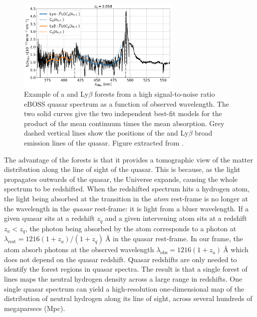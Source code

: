 \begin{figure}[!th]
    \centering
    \includegraphics[width=0.7\textwidth]{fig/forests/forest_example.png}
    \caption{Example of a \lya and Ly$\beta$ forests from a high signal-to-noise ratio 
    eBOSS quasar spectrum as a function of observed wavelength. 
    The two solid curves give the two independent best-fit models for the product of the mean continuum times the mean absorption. 
    Grey dashed vertical lines show the positions of the \lya and Ly$\beta$ broad emission lines of the quasar. 
    Figure extracted from \cite{dumasdesbourbouxhelionCompletedSDSSIVExtended2020}.}
    \label{fig:forest}
\end{figure}

The advantage of the forests is that it provides a tomographic 
view of the matter distribution along the line of sight of the quasar. 
This is because, as the light propagates outwards of the quasar, the 
Universe expands, causing the whole spectrum to be redshifted. 
When the redshifted spectrum hits a hydrogen atom, the light being
absorbed at the \lya transition in the \emph{atom} rest-frame 
is no longer at the \lya wavelength in the \emph{quasar} rest-frame:
it is light from a bluer wavelength. 
If a given quasar sits at a redshift $z_q$ and 
a given intervening atom sits at a redshift $z_a < z_q$, the \lya photon being absorbed
by the atom corresponds to a photon at $\lambda_\mathrm{rest}= 1216(1+z_a)/(1+z_q)~\unit{\angstrom}$
in the quasar rest-frame. 
In our frame, the atom absorb \lya photons at the observed wavelength
$\lambda_\mathrm{obs}= {1216(1+z_a)}~\unit{\angstrom}$ which does not depend on the quasar redshift.
Quasar redshifts are only needed to identify the \lya forest regions in quasar spectra. 
The result is that a single forest of lines maps the neutral
hydrogen density across a large range in redshifts. 
One single quasar spectrum can yield a high-resolution one-dimensional map of 
the distribution of neutral hydrogen along its line of sight, 
across several hundreds of megaparsecs (Mpc). 

